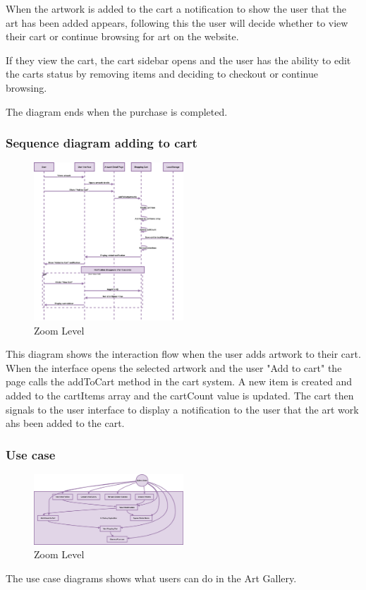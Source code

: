 \documentclass[]{project_final}
\begin{document}
When the artwork is added to the cart a notification to show the user that the art has been added appears, following this the user will decide whether to view their cart or continue browsing for art on the website.

If they view the cart, the cart sidebar opens and the user has the ability to edit the carts status by removing items and deciding to checkout or continue browsing.

The diagram ends when the purchase is completed.
\newpage
\subsubsection{Sequence diagram adding to cart}

\begin{figure}[ht!]
  \centering
  \includegraphics[width=0.5\textwidth]{AGSequenceAddingArtToCart.png}
  \vspace*{0.0cm}
  \caption{Zoom Level}
  \label{fig:1}
\end{figure}

This diagram shows the interaction flow when the user adds artwork to their cart. When the interface opens the selected artwork and the user "Add to cart" the page calls the addToCart method in the cart system. A new item is created and added to the cartItems array and the cartCount value is updated. The cart then signals to the user interface to display a notification to the user that the art work ahs been added to the cart.

\newpage
\subsubsection{Use case}

\begin{figure}[ht!]
  \centering
  \includegraphics[width=0.5\textwidth]{AGUseCase.png}
  \vspace*{0.0cm}
  \caption{Zoom Level}
  \label{fig:1}
\end{figure}
The use case diagrams shows what users can do in the Art Gallery.
\newpage
\end{document}
